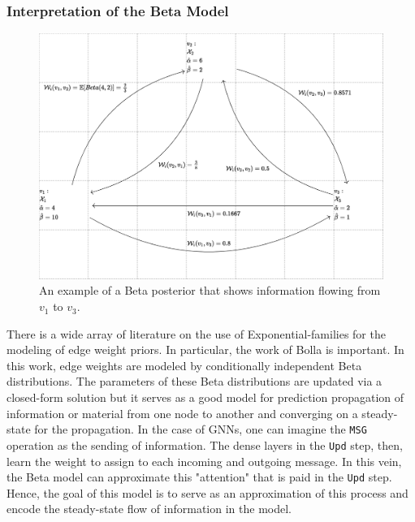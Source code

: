 \subsubsection{Interpretation of the Beta Model}
\begin{figure}[t]
	\centering
	\includegraphics[width=\textwidth]{images/beta_ex.png}
	\caption{An example of a Beta posterior that shows information flowing from $v_1$ to $v_3$.}
	\label{fig:beta-ex}
\end{figure}
There is a wide array of literature on the use of Exponential-families for the modeling of edge weight priors. In particular, the work of Bolla \cite{bolla_estimating_2017} is important. In this work, edge weights are modeled by conditionally independent Beta distributions. The parameters of these Beta distributions are updated via a closed-form solution but it serves as a good model for prediction propagation of information or material from one node to another and converging on a steady-state for the propagation. In the case of GNNs, one can imagine the \verb|MSG| operation as the sending of information. The dense layers in the \verb|Upd| step, then, learn the weight to assign to each incoming and outgoing message. In this vein, the Beta model can approximate this "attention" that is paid in the \verb|Upd| step. Hence, the goal of this model is to serve as an approximation of this process and encode the steady-state flow of information in the model.
